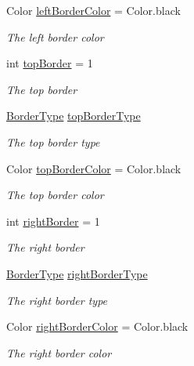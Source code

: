 \begin{DoxyCompactItemize}
Color \hyperlink{class_lerp2_a_p_i_1_1_utility_1_1_texture_border_a158ab53d4c9f969867abdb6b11a0641b}{left\+Border\+Color} = Color.\+black
\begin{DoxyCompactList}\small\item\em The left border color \end{DoxyCompactList}\item 
int \hyperlink{class_lerp2_a_p_i_1_1_utility_1_1_texture_border_ab7950afd91b801d1987f6d3b920c0118}{top\+Border} = 1
\begin{DoxyCompactList}\small\item\em The top border \end{DoxyCompactList}\item 
\hyperlink{namespace_lerp2_a_p_i_1_1_utility_a8046e09472382edc5b740291a380c94c}{Border\+Type} \hyperlink{class_lerp2_a_p_i_1_1_utility_1_1_texture_border_a08229d19679369eb15ba1e6ccbca7e89}{top\+Border\+Type}
\begin{DoxyCompactList}\small\item\em The top border type \end{DoxyCompactList}\item 
Color \hyperlink{class_lerp2_a_p_i_1_1_utility_1_1_texture_border_aac01e793a9aefafa7b3eb7cc8d2b7398}{top\+Border\+Color} = Color.\+black
\begin{DoxyCompactList}\small\item\em The top border color \end{DoxyCompactList}\item 
int \hyperlink{class_lerp2_a_p_i_1_1_utility_1_1_texture_border_a14900d57129a1ea189b44b0cb179077c}{right\+Border} = 1
\begin{DoxyCompactList}\small\item\em The right border \end{DoxyCompactList}\item 
\hyperlink{namespace_lerp2_a_p_i_1_1_utility_a8046e09472382edc5b740291a380c94c}{Border\+Type} \hyperlink{class_lerp2_a_p_i_1_1_utility_1_1_texture_border_ae38752a57778a1fa1a49fd5be753f737}{right\+Border\+Type}
\begin{DoxyCompactList}\small\item\em The right border type \end{DoxyCompactList}\item 
Color \hyperlink{class_lerp2_a_p_i_1_1_utility_1_1_texture_border_a7f0d46d082c79ead87683a2884d6fe2d}{right\+Border\+Color} = Color.\+black
\begin{DoxyCompactList}\small\item\em The right border color \end{DoxyCompactList}\item 

\end{DoxyCompactItemize}
